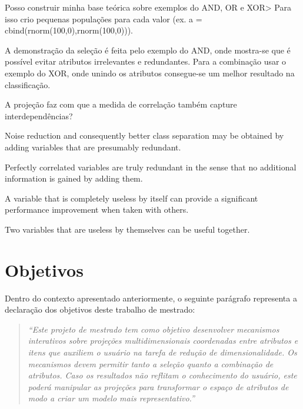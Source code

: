 Posso construir minha base teórica sobre exemplos do AND, OR e XOR> Para isso crio pequenas populações para cada valor (ex. a = cbind(rnorm(100,0),rnorm(100,0))).

A demonstração da seleção é feita pelo exemplo do AND, onde mostra-se que é possível evitar atributos irrelevantes e redundantes.
Para a combinação usar o exemplo do XOR, onde unindo os atributos consegue-se um melhor resultado na classificação.

A projeção faz com que a medida de correlação também capture interdependências?

Noise reduction and consequently better class separation may be obtained by adding variables that are presumably redundant.

Perfectly correlated variables are truly redundant in the sense that no additional information is gained by adding them.

A variable that is completely useless by itself can provide a significant performance improvement when taken with others.

Two variables that are useless by themselves can be useful together.

\section{Objetivos}



Dentro do contexto apresentado anteriormente, o seguinte parágrafo representa a declaração dos objetivos deste trabalho de mestrado:

\begin{quote}
    \emph{``Este projeto de mestrado tem como objetivo desenvolver mecanismos interativos sobre projeções multidimensionais coordenadas entre atributos e itens que auxiliem o usuário na tarefa de redução de dimensionalidade. Os mecanismos devem permitir tanto a seleção quanto a combinação de atributos. Caso os resultados não reflitam o conhecimento do usuário, este poderá manipular as projeções para transformar o espaço de atributos de modo a criar um modelo mais representativo.''}
\end{quote}

